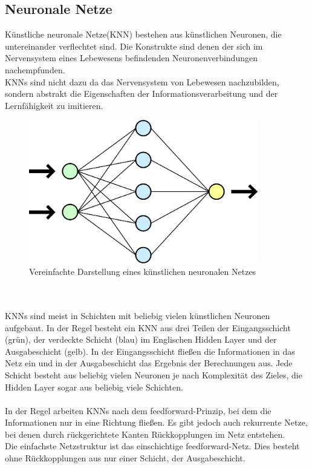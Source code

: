 \documentclass[12pt,oneside,a4paper,parskip]{scrbook}
\begin{document}
\subsection{Neuronale Netze}
Künstliche neuronale Netze(KNN) bestehen aus künstlichen Neuronen, die untereinander verflechtet sind. Die Konstrukte sind denen der sich im Nervensystem eines Lebewesens befindenden Neuronenverbindungen nachempfunden. \\
KNNs sind nicht dazu da das Nervensystem von Lebewesen nachzubilden, sondern abstrakt die Eigenschaften der Informationsverarbeitung und der Lernfähigkeit zu imitieren.
\begin{figure}[h]
	\begin{center}
		\includegraphics[width=10cm]{Bilder/Neurales_Netz.png}
		\caption{Vereinfachte Darstellung eines künstlichen neuronalen Netzes}
		\label{fig:wikiNeuronalesNetz}
	\end{center}
\end{figure}
\\\\KNNs sind meist in Schichten mit beliebig vielen künstlichen Neuronen aufgebaut. In der Regel besteht ein KNN aus drei Teilen der Eingangsschicht (grün), der verdeckte Schicht (blau) im Englischen Hidden Layer und der Ausgabeschicht (gelb). In der Eingangsschicht fließen die Informationen in das Netz ein und in der Ausgabeschicht das Ergebnis der Berechnungen aus. Jede Schicht besteht aus beliebig vielen Neuronen je nach Komplexität des Zieles, die Hidden Layer sogar aus beliebig viele Schichten.
\\\\
In der Regel arbeiten KNNs nach dem feedforward-Prinzip, bei dem die Informationen nur in eine Richtung fließen. Es gibt jedoch auch rekurrente Netze, bei denen durch rückgerichtete Kanten Rückkopplungen im Netz entstehen. \\
Die einfachste Netzstruktur ist das einschichtige feedforward-Netz. Dies besteht ohne Rückkopplungen aus nur einer Schicht, der Ausgabeschicht.
\end{document}
